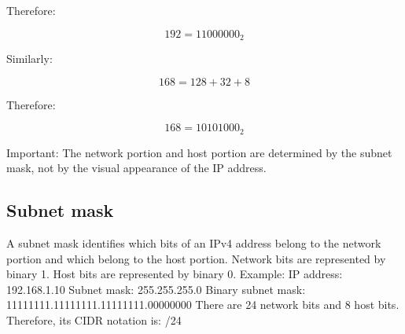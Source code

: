Therefore:

\[
192=11000000_2
\]

Similarly:

\[
168=128+32+8
\]

Therefore:

\[
168=10101000_2
\]

Important: The network portion and host portion are determined by the subnet mask, not by the visual appearance of the IP address.
\subsection{Subnet mask}
A subnet mask identifies which bits of an IPv4 address belong to the network portion and which belong to the host portion.
Network bits are represented by binary 1.
Host bits are represented by binary 0.
Example:
IP address:
192.168.1.10
Subnet mask:
255.255.255.0
Binary subnet mask:
11111111.11111111.11111111.00000000
There are 24 network bits and 8 host bits.
Therefore, its CIDR notation is:
/24
